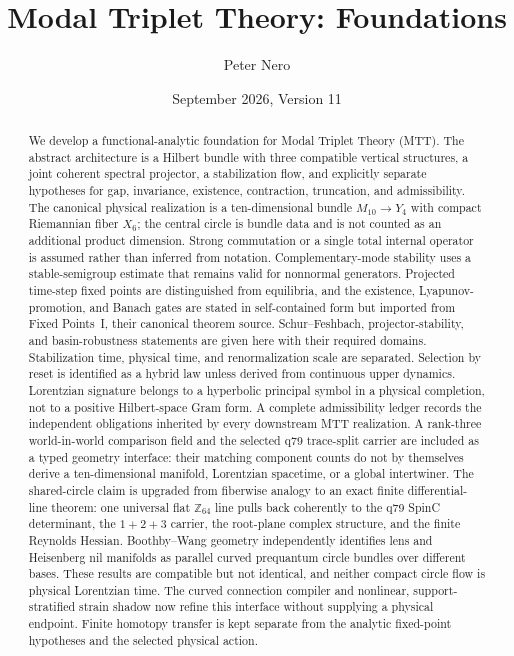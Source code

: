 \documentclass[11pt]{article}
\title{Modal Triplet Theory: Foundations}
\author{Peter Nero}
\date{September 2026, Version 11}
\begin{document}
\maketitle

\begin{abstract}
We develop a functional-analytic foundation for Modal Triplet Theory
(MTT). The abstract architecture is a Hilbert bundle with three compatible
vertical structures, a joint coherent spectral projector, a stabilization
flow, and explicitly separate hypotheses for gap, invariance, existence,
contraction, truncation, and admissibility. The canonical physical realization
is a ten-dimensional bundle $M_{10}\to Y_4$ with compact Riemannian fiber
$X_6$; the central circle is bundle data and is not counted as an additional
product dimension. Strong commutation or a single total internal operator is
assumed rather than inferred from notation. Complementary-mode stability uses
a stable-semigroup estimate that remains valid for nonnormal generators.
Projected time-step fixed points are distinguished from equilibria, and
the existence, Lyapunov-promotion, and Banach gates are stated in
self-contained form but imported from Fixed Points~I, their canonical theorem
source. Schur--Feshbach, projector-stability, and basin-robustness statements
are given here with their required domains. Stabilization time, physical time, and
renormalization scale are separated. Selection by reset is identified as a
hybrid law unless derived from continuous upper dynamics. Lorentzian signature
belongs to a hyperbolic principal symbol in a physical completion, not to a
positive Hilbert-space Gram form. A complete admissibility ledger records the
independent obligations inherited by every downstream MTT realization. A
rank-three world-in-world comparison field and the selected q79 trace-split
carrier are included as a typed geometry interface: their matching component
counts do not by themselves derive a ten-dimensional manifold, Lorentzian
spacetime, or a global intertwiner. The shared-circle claim is upgraded from
fiberwise analogy to an exact finite differential-line theorem: one universal
flat $\mathbb Z_{64}$ line pulls back coherently to the q79 SpinC determinant,
the $1+2+3$ carrier, the root-plane complex structure, and the finite Reynolds
Hessian. Boothby--Wang geometry independently identifies lens and Heisenberg
nil manifolds as parallel curved prequantum circle bundles over different
bases. These results are compatible but not identical, and neither compact
circle flow is physical Lorentzian time.
The curved connection compiler and nonlinear, support-stratified strain
shadow now refine this interface without supplying a physical endpoint.
Finite homotopy transfer is kept separate from the analytic fixed-point
hypotheses and the selected physical action.
\end{abstract}
\end{document}
